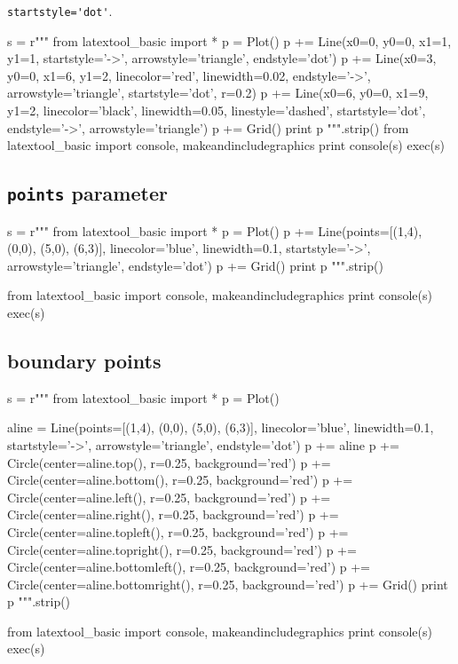 \newpage
\verb!startstyle='dot'!.
\begin{python}
s = r"""
from latextool_basic import *
p = Plot()
p += Line(x0=0, y0=0, x1=1, y1=1, startstyle='->', 
                                  arrowstyle='triangle', endstyle='dot')
p += Line(x0=3, y0=0, x1=6, y1=2, linecolor='red', linewidth=0.02, 
                                  endstyle='->', arrowstyle='triangle',
                                  startstyle='dot', r=0.2)
p += Line(x0=6, y0=0, x1=9, y1=2, linecolor='black', linewidth=0.05, 
                                  linestyle='dashed', startstyle='dot', 
                                  endstyle='->',  arrowstyle='triangle')
p += Grid()
print p
""".strip()
from latextool_basic import console, makeandincludegraphics
print console(s)
exec(s)
\end{python}


\newpage
\subsection{\texttt{points} parameter}

\begin{python}
s = r"""
from latextool_basic import *
p = Plot()
p += Line(points=[(1,4), (0,0), (5,0), (6,3)], 
          linecolor='blue', linewidth=0.1, 
          startstyle='->', arrowstyle='triangle', endstyle='dot')
p += Grid()
print p
""".strip()

from latextool_basic import console, makeandincludegraphics
print console(s)
exec(s)
\end{python}


\newpage
\subsection{boundary points}

\begin{python}
s = r"""
from latextool_basic import *
p = Plot()

aline = Line(points=[(1,4), (0,0), (5,0), (6,3)], 
             linecolor='blue', linewidth=0.1, 
             startstyle='->', arrowstyle='triangle', endstyle='dot')
p += aline
p += Circle(center=aline.top(), r=0.25, background='red')
p += Circle(center=aline.bottom(), r=0.25, background='red')
p += Circle(center=aline.left(), r=0.25, background='red')
p += Circle(center=aline.right(), r=0.25, background='red')
p += Circle(center=aline.topleft(), r=0.25, background='red')
p += Circle(center=aline.topright(), r=0.25, background='red')
p += Circle(center=aline.bottomleft(), r=0.25, background='red')
p += Circle(center=aline.bottomright(), r=0.25, background='red')
p += Grid()
print p
""".strip()

from latextool_basic import console, makeandincludegraphics
print console(s)
exec(s)
\end{python}


